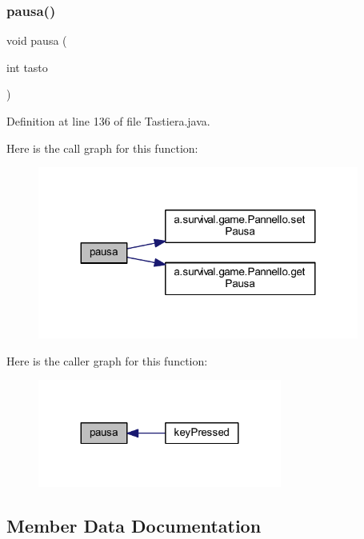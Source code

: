 \subsubsection{\texorpdfstring{pausa()}{pausa()}}
{\footnotesize\ttfamily void pausa (\begin{DoxyParamCaption}\item[{int}]{tasto }\end{DoxyParamCaption})}



Definition at line 136 of file Tastiera.\+java.

Here is the call graph for this function\+:
\nopagebreak
\begin{figure}[H]
\begin{center}
\leavevmode
\includegraphics[width=299pt]{classa_1_1survival_1_1game_1_1_tastiera_ae1955cea10e34f2e5f1df55d2a18cce7_cgraph}
\end{center}
\end{figure}
Here is the caller graph for this function\+:
\nopagebreak
\begin{figure}[H]
\begin{center}
\leavevmode
\includegraphics[width=227pt]{classa_1_1survival_1_1game_1_1_tastiera_ae1955cea10e34f2e5f1df55d2a18cce7_icgraph}
\end{center}
\end{figure}


\subsection{Member Data Documentation}
\mbox{\label{classa_1_1survival_1_1game_1_1_tastiera_a7aff3cc547651aaaee522d917b29bf08}} 
